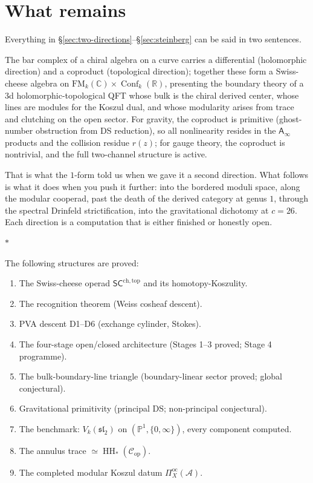 \documentclass[11pt]{article}
\newcommand{\cA}{\mathcal{A}}
\newcommand{\cC}{\mathcal{C}}
\newcommand{\fsl}{\mathfrak{sl}}
\newcommand{\C}{\mathbb{C}}
\newcommand{\R}{\mathbb{R}}
\newcommand{\bP}{\mathbb{P}}
\newcommand{\Ainf}{\mathsf{A}_{\infty}}
\newcommand{\SCchtop}{\mathsf{SC}^{\mathrm{ch,top}}}
\newcommand{\FM}{\mathrm{FM}}
\newcommand{\HH}{\operatorname{HH}}
\DeclareMathOperator{\Conf}{Conf}
\newcommand{\sep}{\bigskip\begin{center}$*$\end{center}\medskip}
\begin{document}
\section{What remains}
\label{sec:what-remains}

Everything in \S\ref{sec:two-directions}--\S\ref{sec:steinberg}
can be said in two sentences.

The bar complex of a chiral algebra on a curve carries a
differential (holomorphic direction) and a coproduct (topological
direction); together these form a Swiss-cheese algebra on
$\FM_k(\C) \times \Conf_k(\R)$, presenting the boundary theory
of a $3$d holomorphic-topological QFT whose bulk is the chiral
derived center, whose lines are modules for the Koszul dual, and
whose modularity arises from trace and clutching on the open
sector.  For gravity, the coproduct is primitive (ghost-number
obstruction from DS reduction), so all nonlinearity resides in the
$\Ainf$ products and the collision residue $r(z)$; for gauge
theory, the coproduct is nontrivial, and the full two-channel
structure is active.

That is what the $1$-form told us when we gave it a second
direction.  What follows is what it does when you push it further:
into the bordered moduli space, along the modular cooperad, past
the death of the derived category at genus $1$, through the
spectral Drinfeld strictification, into the gravitational
dichotomy at $c = 26$.  Each direction is a computation that
is either finished or honestly open.

\sep

The following structures are proved:
\begin{enumerate}[nosep]
\item The Swiss-cheese operad $\SCchtop$ and its
  homotopy-Koszulity.
\item The recognition theorem (Weiss cosheaf descent).
\item PVA descent D1--D6 (exchange cylinder, Stokes).
\item The four-stage open/closed architecture (Stages 1--3
  proved; Stage 4 programme).
\item The bulk-boundary-line triangle (boundary-linear sector
  proved; global conjectural).
\item Gravitational primitivity (principal DS; non-principal
  conjectural).
\item The benchmark: $V_k(\fsl_2)$ on $(\bP^1, \{0,\infty\})$,
  every component computed.
\item The annulus trace $\simeq \HH_*(\cC_{\mathrm{op}})$.
\item The completed modular Koszul datum $\Pi^{\mathrm{oc}}_X(\cA)$.
\end{enumerate}
\end{document}
